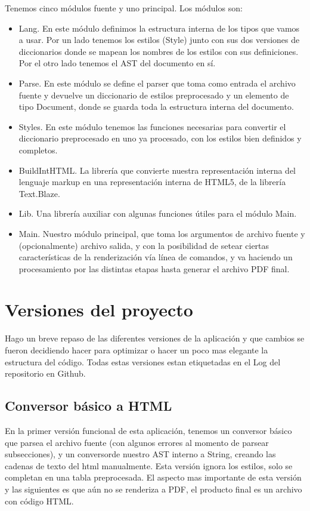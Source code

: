\documentclass{article}
\begin{document}
Tenemos cinco módulos fuente y uno principal. Los módulos son:
\begin{itemize}
    \item Lang. En este módulo definimos la estructura interna de los tipos que vamos a usar. Por un lado tenemos los estilos (Style) junto con sus dos versiones de diccionarios donde se mapean los nombres de los estilos con sus definiciones. Por el otro lado tenemos el AST del documento en sí.
    \item Parse. En este módulo se define el parser que toma como entrada el archivo fuente y devuelve un diccionario de estilos preprocesado y un elemento de tipo Document, donde se guarda toda la estructura interna del documento.
    \item Styles. En este módulo tenemos las funciones necesarias para convertir el diccionario preprocesado en uno ya procesado, con los estilos bien definidos y completos.
    \item BuildIntHTML. La librería que convierte nuestra representación interna del lenguaje markup en una representación interna de HTML5, de la librería Text.Blaze.
    \item Lib. Una librería auxiliar con algunas funciones útiles para el módulo Main.
    \item Main. Nuestro módulo principal, que toma los argumentos de archivo fuente y (opcionalmente) archivo salida, y con la posibilidad de setear ciertas características de la renderización vía línea de comandos, y va haciendo un procesamiento por las distintas etapas hasta generar el archivo PDF final.
\end{itemize}

\section{Versiones del proyecto}

Hago un breve repaso de las diferentes versiones de la aplicación y que cambios se fueron decidiendo hacer para optimizar o hacer un poco mas elegante la estructura del código. Todas estas versiones estan etiquetadas en el Log del repositorio en Github.

\subsection{Conversor básico a HTML}
En la primer versión funcional de esta aplicación, tenemos un conversor básico que parsea el archivo fuente (con algunos errores al momento de parsear subsecciones), y un conversorde nuestro AST interno a String, creando las cadenas de texto del html manualmente. Esta versión ignora los estilos, solo se completan en una tabla preprocesada. El aspecto mas importante de esta versión y las siguientes es que aún no se renderiza a PDF, el producto final es un archivo con código HTML.
\end{document}
